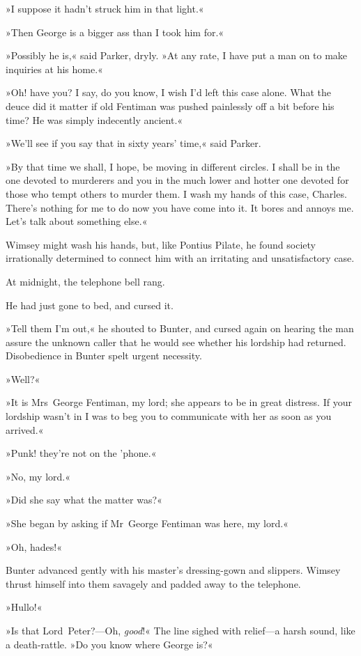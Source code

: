 »I suppose it hadn't struck him in that light.«

»Then George is a bigger ass than I took him for.«

»Possibly he is,« said Parker, dryly. »At any rate, I have put a man on to make inquiries at his home.«

»Oh! have you? I say, do you know, I wish I'd left this case alone. What the deuce did it matter if old Fentiman was pushed painlessly off a bit before his time? He was simply indecently ancient.«

»We'll see if you say that in sixty years' time,« said Parker.

»By that time we shall, I hope, be moving in different circles. I shall be in the one devoted to murderers and you in the much lower and hotter one devoted for those who tempt others to murder them. I wash my hands of this case, Charles. There's nothing for me to do now you have come into it. It bores and annoys me. Let's talk about something else.«

Wimsey might wash his hands, but, like Pontius Pilate, he found society irrationally determined to connect him with an irritating and unsatisfactory case.

At midnight, the telephone bell rang.

He had just gone to bed, and cursed it.

»Tell them I'm out,« he shouted to Bunter, and cursed again on hearing the man assure the unknown caller that he would see whether his lordship had returned. Disobedience in Bunter spelt urgent necessity.

»Well?«

»It is Mrs~George Fentiman, my lord; she appears to be in great distress. If your lordship wasn't in I was to beg you to communicate with her as soon as you arrived.«

»Punk! they're not on the 'phone.«

»No, my lord.«

»Did she say what the matter was?«

»She began by asking if Mr~George Fentiman was here, my lord.«

»Oh, hades!«

Bunter advanced gently with his master's dressing-gown and slippers. Wimsey thrust himself into them savagely and padded away to the telephone.

»Hullo!«

»Is that Lord~Peter?—Oh, \textit{good}!« The line sighed with relief—a harsh sound, like a death-rattle. »Do you know where George is?«

